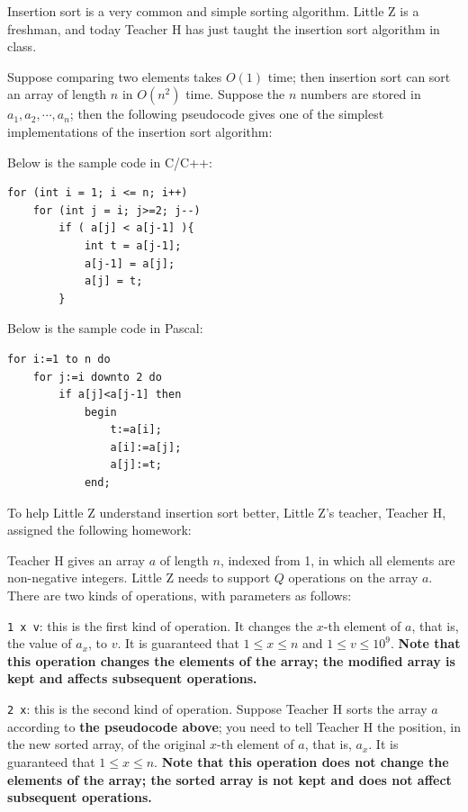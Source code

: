 \documentclass[11pt]{article}
\begin{document}
Insertion sort is a very common and simple sorting algorithm.
Little Z is a freshman, and today Teacher H has just taught the insertion
sort algorithm in class.

Suppose comparing two elements takes $O(1)$ time;
then insertion sort can sort an array of length $n$ in $O(n^2)$ time.
Suppose the $n$ numbers are stored in $a_1, a_2, \cdots, a_n$;
then the following pseudocode gives one of the simplest implementations of
the insertion sort algorithm:

Below is the sample code in C/C++:

\begin{verbatim}
for (int i = 1; i <= n; i++)
    for (int j = i; j>=2; j--)
        if ( a[j] < a[j-1] ){
            int t = a[j-1];
            a[j-1] = a[j];
            a[j] = t;
        }
\end{verbatim}

Below is the sample code in Pascal:

\begin{verbatim}
for i:=1 to n do
    for j:=i downto 2 do
        if a[j]<a[j-1] then
            begin
                t:=a[i];
                a[i]:=a[j];
                a[j]:=t;
            end;
\end{verbatim}

To help Little Z understand insertion sort better, Little Z's teacher,
Teacher H, assigned the following homework:

Teacher H gives an array $a$ of length $n$, indexed from 1, in which all
elements are non-negative integers.
Little Z needs to support $Q$ operations on the array $a$.
There are two kinds of operations, with parameters as follows:

\texttt{1 x v}: this is the first kind of operation.
It changes the $x$-th element of $a$, that is, the value of $a_x$, to $v$.
It is guaranteed that $1 \le x \le n$ and $1 \le v \le 10^9$.
\textbf{Note that this operation changes the elements of the array;
the modified array is kept and affects subsequent operations.}

\texttt{2 x}: this is the second kind of operation.
Suppose Teacher H sorts the array $a$ according to
\textbf{the pseudocode above};
you need to tell Teacher H the position, in the new sorted array, of the
original $x$-th element of $a$, that is, $a_x$.
It is guaranteed that $1 \le x \le n$.
\textbf{Note that this operation does not change the elements of the
array; the sorted array is not kept and does not affect subsequent
operations.}
\end{document}
